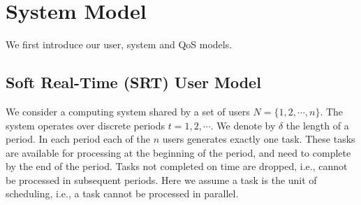 \documentclass[prodmode,acmtompecs]{acmsmall}
\newcommand{\fullUserSet}{N}
\newcommand{\myComments}[1]{}
\newif\ifdissertation
\newcommand{\dissertationStart}{\ifdissertation  \myComments{Dissertation version: }}
\newcommand{\commentEnd}{\myComments{End}}
\begin{document}
\section{System Model}
\label{sec_system_model}
We first introduce our user, system and QoS models. 

\subsection{Soft Real-Time (SRT) User Model}
We consider a computing system shared by a set of users $\fullUserSet = \{1, 2, \cdots, n\}$. 
The system operates over discrete periods $t = 1, 2, \cdots$. We denote by $\delta$ the length of a period.
In each period each of the $n$ users generates exactly one task. 
These tasks are available for processing at the beginning of the period, and need to complete by the end of the period. 
Tasks not completed on time are dropped, i.e., cannot be processed in subsequent periods. 
Here we assume a task is the unit of scheduling, i.e., a task cannot be processed in parallel. 

\dissertationStart
We consider a system wherein $n$ users indexed from $1$ to $n$ share a centralized computing system. Let $\fullUserSet = \{1, 2, \cdots, n\}$ be the user set. 
The system operates in discrete time, over periods $t = 1, 2, \cdots$. We denote by $\delta$ the length of a period. 
The users generate streams of tasks periodically. Specifically in each period, each of the $n$ users generates exactly one task. 
These tasks are available for processing, i.e., released, at the beginning of the period, and need to complete by the end of the period. 
Tasks not completed on time are dropped, i.e., cannot be processed in subsequent periods. 
Figure~\ref{figure_task_generation} exhibits the above task generation process. 
Here we assume a task is the unit of scheduling, i.e., a task cannot be processed in parallel on multiple compute resources. 
In the sequel we will discuss generalizations where a task contains dependent sub-tasks. 
\commentEnd\fi

\dissertationStart
\begin{figure}[htp]
  \centering
  \texttt{[image: Figures/task\_generation.pdf]}
  \caption{An example illustrating the task generation model. It shows the start and end points of periods. Each down and up arrow represents the release time and deadline of a task, respectively. }
  \label{figure_task_generation}
\end{figure}
\commentEnd\fi
\end{document}
